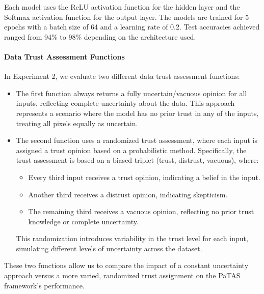 Each model uses the ReLU activation function for the hidden layer and the Softmax activation function for the output layer. The models are trained for 5 epochs with a batch size of 64 and a learning rate of 0.2. Test accuracies achieved ranged from 94\% to 98\% depending on the architecture used.


\paragraph{Data Trust Assessment Functions}
In Experiment 2, we evaluate two different data trust assessment functions:
\begin{itemize}
    \item The first function always returns a fully uncertain/vacuous opinion for all inputs, reflecting complete uncertainty about the data. This approach represents a scenario where the model has no prior trust in any of the inputs, treating all pixels equally as uncertain.
    \item The second function uses a randomized trust assessment, where each input is assigned a trust opinion based on a probabilistic method. Specifically, the trust assessment is based on a biased triplet (trust, distrust, vacuous), where:
    \begin{itemize}
        \item Every third input receives a trust opinion, indicating a belief in the input.
        \item Another third receives a distrust opinion, indicating skepticism.
        \item The remaining third receives a vacuous opinion, reflecting no prior trust knowledge or complete uncertainty.
    \end{itemize}
    This randomization introduces variability in the trust level for each input, simulating different levels of uncertainty across the dataset.
\end{itemize}

These two functions allow us to compare the impact of a constant uncertainty approach versus a more varied, randomized trust assignment on the PaTAS framework’s performance.


